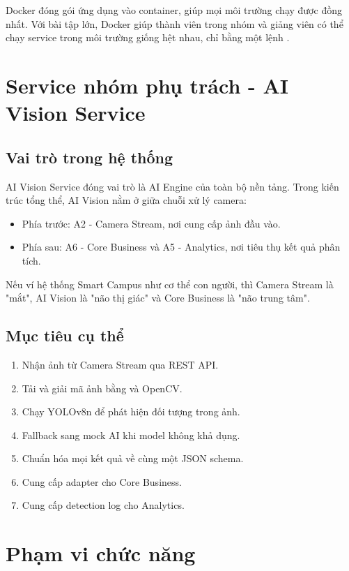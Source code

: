 Docker đóng gói ứng dụng vào container, giúp mọi môi trường chạy được đồng nhất. Với bài tập lớn, Docker giúp thành viên trong nhóm và giảng viên có thể chạy service trong môi trường giống hệt nhau, chỉ bằng một lệnh .

\section{Service nhóm phụ trách - AI Vision Service}

\subsection{Vai trò trong hệ thống}

AI Vision Service đóng vai trò là AI Engine của toàn bộ nền tảng. Trong kiến trúc tổng thể, AI Vision nằm ở giữa chuỗi xử lý camera:

\begin{itemize}
    \item Phía trước: A2 - Camera Stream, nơi cung cấp ảnh đầu vào.
    \item Phía sau: A6 - Core Business và A5 - Analytics, nơi tiêu thụ kết quả phân tích.
\end{itemize}

Nếu ví hệ thống Smart Campus như cơ thể con người, thì Camera Stream là "mắt", AI Vision là "não thị giác" và Core Business là "não trung tâm".

\subsection{Mục tiêu cụ thể}

\begin{enumerate}
    \item Nhận ảnh từ Camera Stream qua REST API.
    \item Tải và giải mã ảnh bằng  và OpenCV.
    \item Chạy YOLOv8n để phát hiện đối tượng trong ảnh.
    \item Fallback sang mock AI khi model không khả dụng.
    \item Chuẩn hóa mọi kết quả về cùng một JSON schema.
    \item Cung cấp adapter cho Core Business.
    \item Cung cấp detection log cho Analytics.
\end{enumerate}

\section{Phạm vi chức năng}

